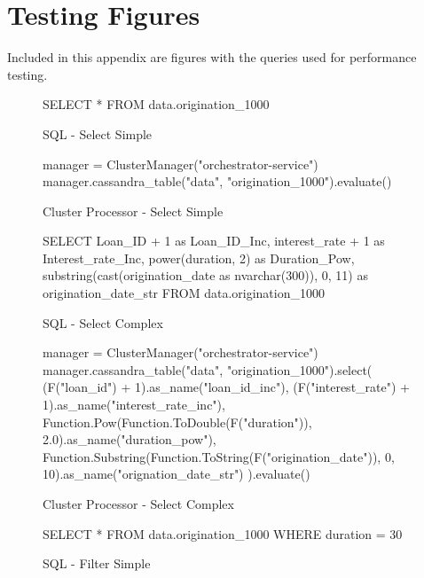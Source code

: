 
\chapter{Testing Figures}\label{cha:testing-figs}

Included in this appendix are figures with the queries used for performance testing.

\begin{figure}[h]
	\centering
	\begin{SQL}
SELECT * FROM data.origination_1000
	\end{SQL}
	\caption{SQL - Select Simple}
	\label{fig:sql-select-simple}
\end{figure}
	
\begin{figure}[h]
	\begin{python}
manager = ClusterManager("orchestrator-service")
manager.cassandra_table("data", "origination_1000").evaluate()
	\end{python}
	\caption{Cluster Processor - Select Simple}
	\label{fig:cluster-select-simple}
\end{figure}

\begin{figure}[h]
	\centering
	\begin{SQL}
SELECT 
Loan_ID + 1 as Loan_ID_Inc, 
interest_rate + 1 as Interest_rate_Inc, 
power(duration, 2) as Duration_Pow, 
substring(cast(origination_date as nvarchar(300)), 0, 11) as origination_date_str 
FROM data.origination_1000
	\end{SQL}
	\caption{SQL - Select Complex}
	\label{fig:sql-select-complex}
\end{figure}

\begin{figure}[h]
	\begin{python}
manager = ClusterManager("orchestrator-service")
manager.cassandra_table("data", "origination_1000").select(
(F("loan_id") + 1).as_name("loan_id_inc"), 
(F("interest_rate") + 1).as_name("interest_rate_inc"),
Function.Pow(Function.ToDouble(F("duration")), 2.0).as_name("duration_pow"),
Function.Substring(Function.ToString(F("origination_date")), 0, 10).as_name("orignation_date_str")
).evaluate()
	\end{python}
	\caption{Cluster Processor - Select Complex}
	\label{fig:cluster-select-complex}
\end{figure}

\begin{figure}[h]
	\centering
	\begin{SQL}
SELECT *
FROM data.origination_1000
WHERE duration = 30
	\end{SQL}
	\caption{SQL - Filter Simple}
	\label{fig:sql-filter-simple}
\end{figure}

